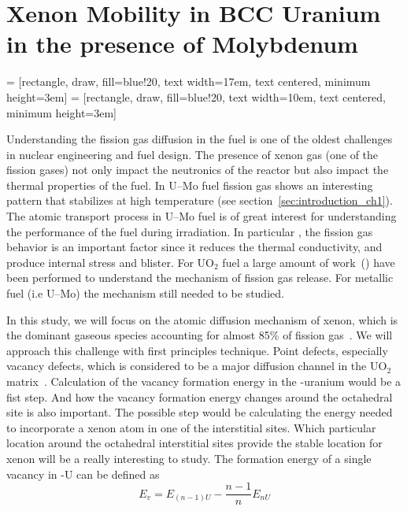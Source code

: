 \chapter[Xenon mobility in U--Mo fuel]{Xenon Mobility in BCC Uranium in the presence of Molybdenum}

 = [rectangle, draw, fill=blue!20,
    text width=17em, text centered, minimum height=3em]
 = [rectangle, draw, fill=blue!20,
	text width=10em, text centered, minimum height=3em]


Understanding the fission gas diffusion in the fuel is one of the oldest challenges in nuclear engineering and fuel design. The presence of xenon gas (one of the fission gases) not only impact the neutronics of the reactor but also impact the thermal properties of the fuel. In U--Mo fuel fission gas shows an interesting pattern that stabilizes at high temperature (see section~\ref{sec:introduction_ch1}). The atomic transport process in U--Mo fuel is of great interest for understanding the performance of the fuel during irradiation. In particular , the fission gas behavior is an important factor since it reduces the thermal conductivity, and produce internal stress and blister. For UO$_2$ fuel a large amount of work~(\cite{petit1999location, crocombette2002ab, freyss2006ab}) have been performed to understand the mechanism of fission gas release. For metallic fuel (i.e U--Mo) the mechanism still needed to be studied.

In this study, we will focus on the atomic diffusion mechanism of xenon, which is the dominant gaseous species accounting for almost 85\% of fission gas~\cite{blades1956ratio, petruska1955absolute}. We will approach this challenge with first principles technique. Point defects, especially vacancy defects, which is considered to be a major diffusion channel in the UO$_2$ matrix~\cite{petit1999location}. Calculation of the vacancy formation energy in the \textgamma-uranium would be a fist step. And how the vacancy formation energy changes around the octahedral site is also important. The possible step would be calculating the energy needed to incorporate a xenon atom in one of the interstitial sites. Which particular location around the octahedral interstitial sites provide the stable location for xenon will be a really interesting to study. The formation energy of a single vacancy in \textgamma-U can be defined as
\begin{equation}
\label{eq_vacancy}
E_v = E_{(n-1)U} - \frac{n-1}{n} E_{nU}
\end{equation}

